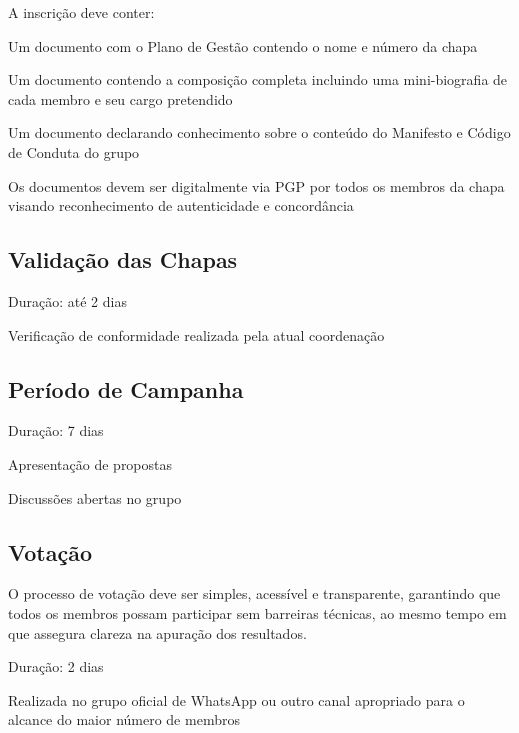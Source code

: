 \documentclass[
  12pt,          %
  a4paper,       %
  oneside,       %
  brazil         %
]{article}
\begin{document}
A inscrição deve conter:

\begin{conduta}
	\item Um documento com o Plano de Gestão contendo o nome e número da chapa
	\item Um documento contendo a composição completa incluindo uma mini-biografia de cada membro e seu cargo pretendido
	\item Um documento declarando conhecimento sobre o conteúdo do Manifesto e Código de Conduta do grupo
	\item Os documentos devem ser digitalmente via PGP por todos os membros da chapa visando reconhecimento de autenticidade e concordância
\end{conduta}

\subsection{Validação das Chapas}

\begin{conduta}
	\item Duração: até 2 dias
	\item Verificação de conformidade realizada pela atual coordenação
\end{conduta}

\subsection{Período de Campanha}

\begin{conduta}
	\item Duração: 7 dias
	\item Apresentação de propostas
	\item Discussões abertas no grupo
\end{conduta}

\subsection{Votação}
O processo de votação deve ser simples, acessível e transparente, garantindo que todos os membros possam participar sem barreiras técnicas, ao mesmo tempo em 
que assegura clareza na apuração dos resultados.

\begin{conduta}
	\item Duração: 2 dias
	\item Realizada no grupo oficial de WhatsApp ou outro canal apropriado para o alcance do maior número de membros
\end{conduta}
\end{document}

